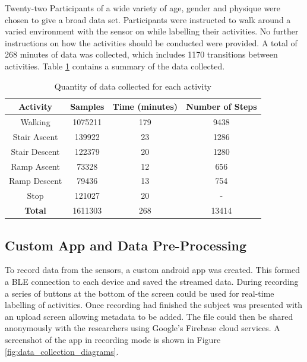\documentclass[sensors,article,submit,moreauthors,pdftex]{Definitions/mdpi}
\begin{document}
Twenty-two Participants of a wide variety of age, gender and physique were chosen to give a broad data set. Participants were instructed to walk around a varied environment with the sensor on while labelling their activities. No further instructions on how the activities should be conducted were provided. A total of 268 minutes of data was collected, which includes 1170 transitions between activities. Table \ref{tab:data_collected_summary} contains a summary of the data collected.

\begin{table}[!hbt]
    \centering
    \caption{Quantity of data collected for each activity}
    \label{tab:data_collected_summary}
    \begin{tabular}{cccc}
        \textbf{Activity} & \textbf{Samples} & \textbf{Time (minutes)} & \textbf{Number of Steps} \\
         \hline
         Walking & 1075211 & 179 & 9438 \\
         Stair Ascent & 139922 & 23 & 1286 \\
         Stair Descent & 122379 & 20 & 1280 \\ 
         Ramp Ascent & 73328 & 12 & 656 \\
         Ramp Descent & 79436 & 13 & 754 \\
         Stop & 121027 & 20 & - \\
         \hline
         \textbf{Total} & 1611303 & 268 & 13414
    \end{tabular}
\end{table}




\subsection{Custom App and Data Pre-Processing}
\label{sec:app}
To record data from the sensors, a custom android app was created. This formed a BLE connection to each device and saved the streamed data. During recording a series of buttons at the bottom of the screen could be used for real-time labelling of activities. Once recording had finished the subject was presented with an upload screen allowing metadata to be added. The file could then be shared anonymously with the researchers using Google's Firebase cloud services. A screenshot of the app in recording mode is shown in Figure \ref{fig:data_collection_diagrams}.
\end{document}
